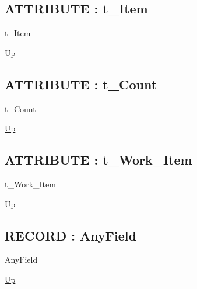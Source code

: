 \par
\par
\subsection*{ATTRIBUTE : t\_Item}
\hypertarget{ecldoc:ml_core.types.t_item}{}
\begin{minipage}[t]{\textwidth}
\begin{flushleft}
 t\_Item 
\end{flushleft}
\end{minipage}
\hyperlink{ecldoc:ML_Core.Types}{Up}

\par
\par
\subsection*{ATTRIBUTE : t\_Count}
\hypertarget{ecldoc:ml_core.types.t_count}{}
\begin{minipage}[t]{\textwidth}
\begin{flushleft}
 t\_Count 
\end{flushleft}
\end{minipage}
\hyperlink{ecldoc:ML_Core.Types}{Up}

\par
\par
\subsection*{ATTRIBUTE : t\_Work\_Item}
\hypertarget{ecldoc:ml_core.types.t_work_item}{}
\begin{minipage}[t]{\textwidth}
\begin{flushleft}
 t\_Work\_Item 
\end{flushleft}
\end{minipage}
\hyperlink{ecldoc:ML_Core.Types}{Up}

\par
\par
\subsection*{RECORD : AnyField}
\hypertarget{ecldoc:ml_core.types.anyfield}{}
\begin{minipage}[t]{\textwidth}
\begin{flushleft}
 AnyField 
\end{flushleft}
\end{minipage}
\hyperlink{ecldoc:ML_Core.Types}{Up}

